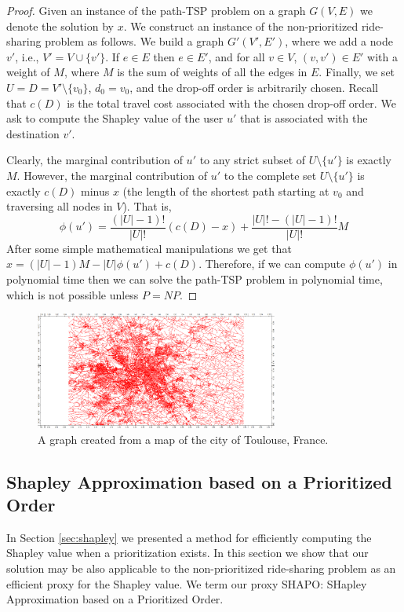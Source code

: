 \documentclass[sigconf]{aamas}
\begin{document}
\begin{proof}
Given an instance of the path-TSP problem on a graph $G(V,E)$ we denote the solution by $x$. We construct an instance of the non-prioritized ride-sharing problem as follows. We build a graph $G'(V',E')$, where we add a node $v'$, i.e., $V' = V \cup \{v'\}$. If $e \in E$ then $e \in E'$, and for all $v \in V$, $(v,v') \in E'$ with a weight of $M$, where $M$ is the sum of weights of all the edges in $E$. Finally, we set $U=D=V' \setminus \{v_0\}$, $d_0 = v_0$, and the drop-off order is arbitrarily chosen. Recall that $c(D)$ is the total travel cost associated with the chosen drop-off order. We ask to compute the Shapley value of the user $u'$ that is associated with the destination $v'$.

Clearly, the marginal contribution of $u'$ to any strict subset of $U \setminus \{u'\}$ is exactly $M$. However, the marginal contribution of $u'$ to the complete set $U \setminus \{u'\}$ is exactly $c(D)$ minus $x$ (the length of the shortest path starting at $v_0$ and traversing all nodes in $V$). That is,
\[
\phi(u') = \frac{(|U|-1)!}{|U|!}(c(D)-x) + \frac{|U|!-(|U|-1)!}{|U|!}M
\]
After some simple mathematical manipulations we get that $x = (|U|-1)M-|U|\phi(u')+c(D)$. Therefore, if we can compute $\phi(u')$ in polynomial time then we can solve the path-TSP problem in polynomial time, which is not possible unless $P=NP$.
\end{proof}


\begin{figure}[hbpt]
\centering
\includegraphics[width=8cm]{CroppedToulouseGraph.pdf} \caption{A graph created from a map of the city of Toulouse, France.}
\label{fig:ToulouseGraph}
\end{figure}

\subsection{Shapley Approximation based on a Prioritized Order}

In Section \ref{sec:shapley} we presented a method for efficiently computing the Shapley value when a prioritization exists. In this section we show that our solution may be also applicable to the non-prioritized ride-sharing problem as an efficient proxy for the Shapley value. We term our proxy SHAPO: SHapley Approximation based on a Prioritized Order.
\end{document}
